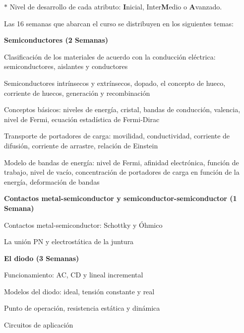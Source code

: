 \documentclass[11pt,oneside,letterpaper]{article}
\begin{document}
$\ast$ Nivel de desarrollo de cada atributo: {\bf{I}}nicial, Inter{\bf{M}}edio o {\bf{A}}vanzado.

\normalsize
{}


\newpage
{}
%
Las 16 semanas que abarcan el curso se distribuyen en los siguientes
temas:
\begin{compactenum}[nolistsep]
\item \textbf{Semiconductores (2 Semanas)}
  \begin{compactenum}[nolistsep]
  \item Clasificación de los materiales de acuerdo con la conducción eléctrica: semiconductores, aislantes y conductores
  \item Semiconductores intrínsecos y extrínsecos, dopado, el concepto de hueco, corriente de huecos, generación y recombinación
  \item Conceptos básicos: niveles de energía, cristal, bandas de conducción, valencia, nivel de Fermi, ecuación estadística de Fermi-Dirac
  \item Transporte de portadores de carga: movilidad, conductividad, corriente de difusión, corriente de arrastre, relación de Einstein
  \item Modelo de bandas de energía: nivel de Fermi, afinidad electrónica, función de trabajo, nivel de vacío, concentración de portadores de carga en función de la energía, deformación de bandas
  \end{compactenum}
  
\item \textbf{Contactos metal-semiconductor y semiconductor-semiconductor (1 Semana)}
  \begin{compactenum}[nolistsep]
  \item Contactos metal-semiconductor: Schottky y Óhmico
  \item La unión PN y electrostática de la juntura
  \end{compactenum}
  
\item \textbf{El diodo (3 Semanas)}
  \begin{compactenum}[nolistsep]
  \item Funcionamiento: AC, CD y lineal incremental 
  \item Modelos del diodo: ideal, tensión constante y real
  \item Punto de operación, resistencia estática y dinámica
  \item Circuitos de aplicación
  \end{compactenum}


\end{compactenum}
\end{document}
